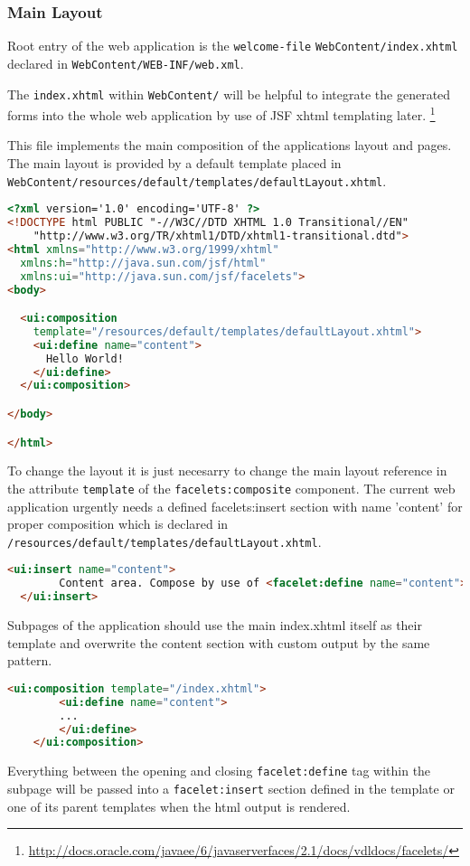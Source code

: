 \subsubsection{Main Layout}
\label{subsec:referenceMainLayout} 

Root entry of the web application is the \texttt{welcome-file}
\texttt{WebContent/index.xhtml} declared in \texttt{WebContent/WEB-INF/web.xml}.

The \texttt{index.xhtml} within \texttt{WebContent/} will be helpful to
integrate the generated forms into the whole web application by use of JSF xhtml
templating later.
\footnote{\url{http://docs.oracle.com/javaee/6/javaserverfaces/2.1/docs/vdldocs/facelets/}}
 
This file implements the main composition of the applications layout and pages.
The main layout is provided by a default template placed in \newline
\texttt{WebContent/resources/default/templates/defaultLayout.xhtml}.

\begin{lstlisting}[language=HTML]
<?xml version='1.0' encoding='UTF-8' ?>
<!DOCTYPE html PUBLIC "-//W3C//DTD XHTML 1.0 Transitional//EN" 
    "http://www.w3.org/TR/xhtml1/DTD/xhtml1-transitional.dtd">
<html xmlns="http://www.w3.org/1999/xhtml"
  xmlns:h="http://java.sun.com/jsf/html"
  xmlns:ui="http://java.sun.com/jsf/facelets">
<body>

  <ui:composition
    template="/resources/default/templates/defaultLayout.xhtml">
    <ui:define name="content">
      Hello World!
    </ui:define>
  </ui:composition>

</body>

</html>
\end{lstlisting}

To change the layout it is just necesarry to change the main layout reference in
the attribute \texttt{template} of the \texttt{facelets:composite} component.
The current web application urgently needs a defined facelets:insert section
with name 'content' for proper composition which is declared in
\texttt{/resources/default/templates/defaultLayout.xhtml}.

\begin{lstlisting}[language=HTML]
 <ui:insert name="content">
    	Content area. Compose by use of <facelet:define name="content">.
  </ui:insert>
\end{lstlisting}

Subpages of the application should use the main index.xhtml itself as
their template and overwrite the content section with custom output by the same
pattern.

\begin{lstlisting}[language=HTML] 
	<ui:composition template="/index.xhtml">
  		<ui:define name="content">
  		...
  		</ui:define>
 	</ui:composition>
\end{lstlisting}

Everything between the opening and closing \texttt{facelet:define} tag within
the subpage will be passed into a \texttt{facelet:insert} section defined in the
template or one of its parent templates when the html output is rendered.